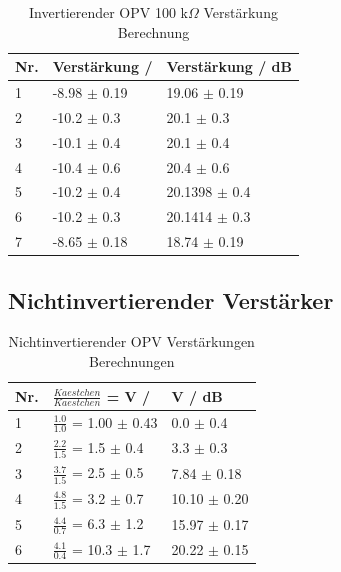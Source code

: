 \documentclass[12pt,a4paper,twoside]{article}
\begin{document}
\begin{table}[H]
    \centering
    \caption{Invertierender OPV 100 k$\Omega$ Verstärkung Berechnung}
    \label{tab:IoVerstärkungenBerechnet100AW}
    \begin{tabular}{| l | l | l |}
        \hline
        Nr. & Verstärkung / & Verstärkung / dB \\
        \hline
        1 & -8.98 $\pm$ 0.19 & 19.06 $\pm$ 0.19 \\
        2 & -10.2 $\pm$ 0.3 & 20.1 $\pm$ 0.3 \\
        3 & -10.1 $\pm$ 0.4 & 20.1 $\pm$ 0.4 \\
        4 & -10.4 $\pm$ 0.6 & 20.4 $\pm$ 0.6 \\
        5 & -10.2 $\pm$ 0.4 & 20.1398 $\pm$ 0.4 \\
        6 & -10.2 $\pm$ 0.3 & 20.1414 $\pm$ 0.3 \\
        7 & -8.65 $\pm$ 0.18 & 18.74 $\pm$ 0.19 \\
        \hline
    \end{tabular}
\end{table}

\subsection{Nichtinvertierender Verstärker}

\begin{table}[H]
    \centering
    \caption{Nichtinvertierender OPV Verstärkungen Berechnungen}
    \label{tab:NioVerstärkungenBerechnetAW}
    \begin{tabular}{| l | l | l |}
        \hline
        Nr. & $\frac{Kaestchen}{Kaestchen}$ = V / & V / dB \\
        \hline
        1 & $\frac{1.0}{1.0}$ =  1.00 $\pm$ 0.43 & 0.0    $\pm$ 0.4 \\
        2 & $\frac{2.2}{1.5}$ =  1.5 $\pm$ 0.4 & 3.3 $\pm$ 0.3 \\
        3 & $\frac{3.7}{1.5}$ =  2.5 $\pm$ 0.5 & 7.84 $\pm$ 0.18 \\
        4 & $\frac{4.8}{1.5}$ =  3.2 $\pm$ 0.7 & 10.10 $\pm$ 0.20 \\
        5 & $\frac{4.4}{0.7}$ =  6.3 $\pm$ 1.2 & 15.97 $\pm$ 0.17 \\
        6 & $\frac{4.1}{0.4}$ = 10.3 $\pm$ 1.7 & 20.22 $\pm$ 0.15 \\
        \hline
    \end{tabular}
\end{table}
\end{document}
